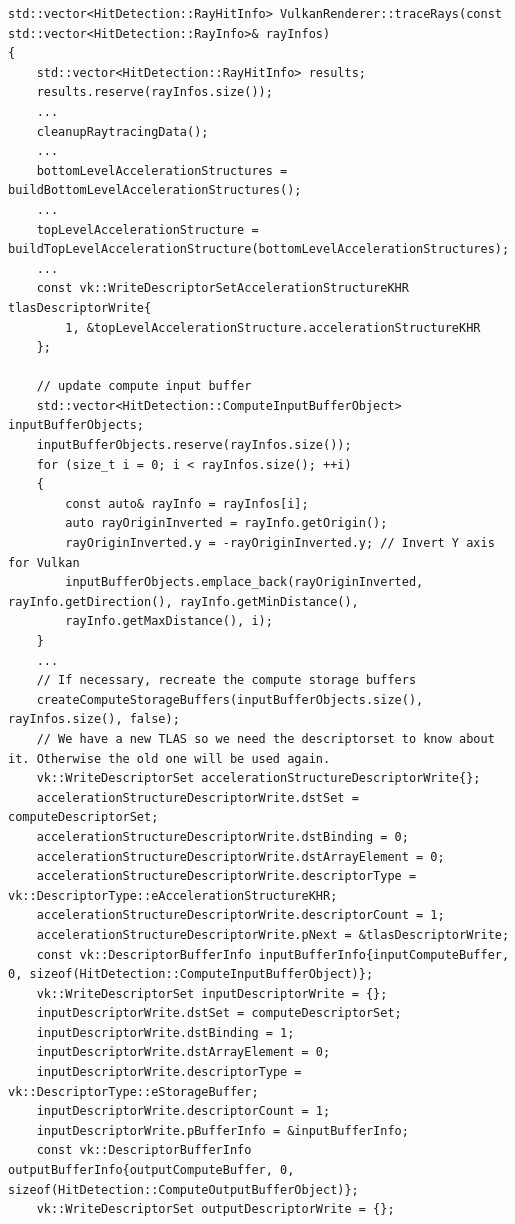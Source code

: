 \documentclass[11pt]{scrartcl}
\begin{document}
	\begin{lstlisting}[caption={\textit{traceRay} Funktion in VulkanRenderer.cpp},label={lst:listing-vulkan-traceraycpp}]
std::vector<HitDetection::RayHitInfo> VulkanRenderer::traceRays(const std::vector<HitDetection::RayInfo>& rayInfos)
{
	std::vector<HitDetection::RayHitInfo> results;
	results.reserve(rayInfos.size());
	...
	cleanupRaytracingData();
	...
	bottomLevelAccelerationStructures = buildBottomLevelAccelerationStructures();
	...
	topLevelAccelerationStructure = buildTopLevelAccelerationStructure(bottomLevelAccelerationStructures);
	...
	const vk::WriteDescriptorSetAccelerationStructureKHR tlasDescriptorWrite{
		1, &topLevelAccelerationStructure.accelerationStructureKHR
	};
	
	// update compute input buffer
	std::vector<HitDetection::ComputeInputBufferObject> inputBufferObjects;
	inputBufferObjects.reserve(rayInfos.size());
	for (size_t i = 0; i < rayInfos.size(); ++i)
	{
		const auto& rayInfo = rayInfos[i];
		auto rayOriginInverted = rayInfo.getOrigin();
		rayOriginInverted.y = -rayOriginInverted.y; // Invert Y axis for Vulkan
		inputBufferObjects.emplace_back(rayOriginInverted, rayInfo.getDirection(), rayInfo.getMinDistance(),
		rayInfo.getMaxDistance(), i);
	}
	...
	// If necessary, recreate the compute storage buffers
	createComputeStorageBuffers(inputBufferObjects.size(), rayInfos.size(), false);
	// We have a new TLAS so we need the descriptorset to know about it. Otherwise the old one will be used again.
	vk::WriteDescriptorSet accelerationStructureDescriptorWrite{};
	accelerationStructureDescriptorWrite.dstSet = computeDescriptorSet;
	accelerationStructureDescriptorWrite.dstBinding = 0;
	accelerationStructureDescriptorWrite.dstArrayElement = 0;
	accelerationStructureDescriptorWrite.descriptorType = vk::DescriptorType::eAccelerationStructureKHR;
	accelerationStructureDescriptorWrite.descriptorCount = 1;
	accelerationStructureDescriptorWrite.pNext = &tlasDescriptorWrite;
	const vk::DescriptorBufferInfo inputBufferInfo{inputComputeBuffer, 0, sizeof(HitDetection::ComputeInputBufferObject)};
	vk::WriteDescriptorSet inputDescriptorWrite = {};
	inputDescriptorWrite.dstSet = computeDescriptorSet;
	inputDescriptorWrite.dstBinding = 1;
	inputDescriptorWrite.dstArrayElement = 0;
	inputDescriptorWrite.descriptorType = vk::DescriptorType::eStorageBuffer;
	inputDescriptorWrite.descriptorCount = 1;
	inputDescriptorWrite.pBufferInfo = &inputBufferInfo;
	const vk::DescriptorBufferInfo outputBufferInfo{outputComputeBuffer, 0, sizeof(HitDetection::ComputeOutputBufferObject)};
	vk::WriteDescriptorSet outputDescriptorWrite = {};

\end{lstlisting}
\end{document}
